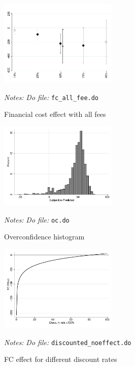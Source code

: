 \documentclass[11pt]{article}
\begin{document}
\begin{figure}[H]
        \caption{Financial cost effect with all fees}
    \label{fc_allfee}
    \begin{center}
        \centering
        \includegraphics[width=0.50\textwidth]{Figuras/fc_allfee_quantile_pro_2.pdf}
    \end{center}
    \footnotesize \textit{Notes: } 
     \footnotesize{ \textit{Do file: }  \texttt{fc\_all\_fee.do}}
\end{figure}

\begin{figure}[H]
        \caption{Overconfidence histogram}
    \label{oc_hist}
    \begin{center}
        \centering
        \includegraphics[width=0.50\textwidth]{Figuras/oc_hist.pdf}
    \end{center}
    \footnotesize \textit{Notes: } 
     \footnotesize{ \textit{Do file: }  \texttt{oc.do}}
\end{figure}

\begin{figure}[H]
        \caption{FC effect for different discount rates}
    \label{oc_hist}
    \begin{center}
        \centering
        \includegraphics[width=0.50\textwidth]{Figuras/discount_effect.pdf}
    \end{center}
    \footnotesize \textit{Notes: } 
     \footnotesize{ \textit{Do file: }  \texttt{discounted\_noeffect.do}}
\end{figure}
\end{document}
